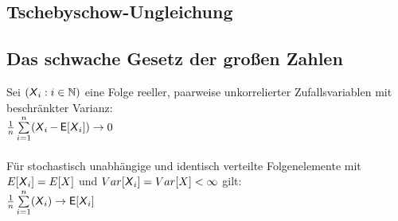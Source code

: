 \documentclass[german,color,6pt]{latex4ei/latex4ei_sheet}
\begin{document}
\begin{sectionbox}
	\subsection{Tschebyschow-Ungleichung}
	
	
\end{sectionbox}
\begin{sectionbox}
	\subsection{Das schwache Gesetz der großen Zahlen}
	Sei $(\operatorname{\textsf{\textit{X}}}_i : i \in \operatorname{\mathbb N})$ eine Folge reeller, paarweise unkorrelierter Zufallsvariablen mit beschränkter Varianz:\\
	$\frac{1}{n} \sum\limits_{i = 1}^n (\operatorname{\textsf{\textit{X}}}_i - \operatorname{\textsf{E}}[\operatorname{\textsf{\textit{X}}}_i]) \rightarrow 0$\\ \\
	Für stochastisch unabhängige und identisch verteilte Folgenelemente mit $E[\operatorname{\textsf{\textit{X}}}_i] = E[X]$ und $Var[\operatorname{\textsf{\textit{X}}}_i] = Var[X] < \infty$ gilt: \\
	$\frac{1}{n} \sum\limits_{i = 1}^n (\operatorname{\textsf{\textit{X}}}_i) \rightarrow \operatorname{\textsf{E}}[\operatorname{\textsf{\textit{X}}}_i] $
\end{sectionbox}

\end{document}
